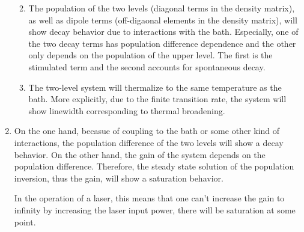 \documentclass{article}
\begin{document}
\begin{enumerate}
\begin{enumerate}
\def\labelenumi{\arabic{enumi}.}
\item
  The population of the two levels (diagonal terms in the density
  matrix), as well as dipole terms (off-digaonal elements in the density
  matrix), will show decay behavior due to interactions with the bath.
  Especially, one of the two decay terms has population difference
  dependence and the other only depends on the population of the upper
  level. The first is the stimulated term and the second accounts for
  spontaneous decay.
\item
  The two-level system will thermalize to the same temperature as the
  bath. More explicitly, due to the finite transition rate, the system
  will show linewidth corresponding to thermal broadening.
\end{enumerate}

\item

On the one hand, becasue of coupling to the bath or some other kind of
interactions, the population difference of the two levels will show a
decay behavior. On the other hand, the gain of the system depends on the
population difference. Therefore, the steady state solution of the
population inversion, thus the gain, will show a saturation behavior.

In the operation of a laser, this means that one can't increase the gain
to infinity by increasing the laser input power, there will be
saturation at some point.
\end{enumerate}
\end{document}
